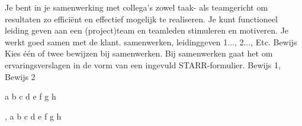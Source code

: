 
\competentie
{%
	\competentieformulier
	{%
		Je bent in je samenwerking met collega’s zowel taak- als teamgericht om resultaten zo efficiënt en effectief mogelijk te realiseren. Je kunt functioneel leiding geven aan een (project)team en teamleden stimuleren en motiveren. Je werkt goed samen met de klant. 
	}
	{%
		samenwerken,%
		leidinggeven%
	}
	{%
		1...,%
		2...,%
		Etc.%
	}
	{%
		Bewijs
	}
	{%
		Kies één of twee bewijzen bij samenwerken. Bij samenwerken gaat het om ervaringsverslagen in de vorm van een ingevuld STARR-formulier.
	}
	{%
		Bewijs 1,%
		Bewijs 2%
	}
}
{%
	\bewijs
	{%
		a
	}
	{%
		\starr
		{%
			b
		}
		{%
			c
		}
		{%
			d
		}
		{%
			e
		}
		{%
			f
		}
		{%
			g
		}
		{%
			h
		}
	}
	{%
		
	},
	\bewijs
	{%
		a
	}
	{%
		\starr
		{%
			b
		}
		{%
			c
		}
		{%
			d
		}
		{%
			e
		}
		{%
			f
		}
		{%
			g
		}
		{%
			h
		}
	}
	{%
		
	}
}
